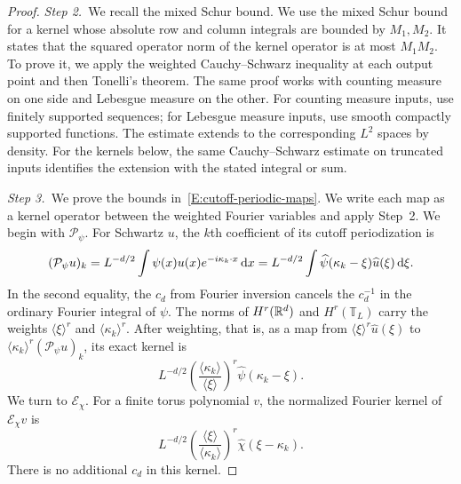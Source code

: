 \begin{proof}
  \medskip
  \noindent\textit{Step 2.~}We recall the mixed Schur bound. We use the mixed
  Schur bound for a
  kernel whose absolute row and column integrals are bounded by $M_1,M_2$. It
  states that the squared operator norm of the kernel operator is at most
  $M_1M_2$. To prove it, we apply the weighted Cauchy--Schwarz inequality at
  each output point and then Tonelli's theorem. The same proof works with
  counting measure on one side and Lebesgue measure on the other. For counting
  measure inputs, use finitely supported sequences; for Lebesgue measure
  inputs, use smooth compactly supported functions. The estimate extends to
  the corresponding $L^2$ spaces by density. For the kernels below, the same
  Cauchy--Schwarz estimate on truncated inputs identifies the extension with
  the stated integral or sum.

  \medskip
  \noindent\textit{Step 3.~}We prove the bounds
  in~\eqref{E:cutoff-periodic-maps}. We write each map as a kernel operator
  between the weighted Fourier variables and apply Step~2. We begin with
  $\mathcal{P}_\psi$. For Schwartz $u$, the $k$th coefficient of its cutoff
  periodization is
  \[
    (\mathcal{P}_\psi u)_k
    = L^{-d/2}\int\psi(x)u(x)e^{-i\kappa_k\cdot x}\,\mathrm{d} x
    = L^{-d/2}\int\widehat{\psi}(\kappa_k-\xi)\widehat{u}(\xi)\,\mathrm{d}\xi.
  \]
  In the second equality, the $c_d$ from Fourier inversion cancels the
  $c_d^{-1}$ in the ordinary Fourier integral of $\psi$. The norms of
  $H^r(\mathbb{R}^d)$ and $H^r(\mathbb{T}_L)$ carry the weights $\langle\xi\rangle^r$
  and $\langle\kappa_k\rangle^r$. After weighting, that is, as a map from
  $\langle\xi\rangle^r\widehat{u}(\xi)$ to
  $\langle\kappa_k\rangle^r(\mathcal{P}_\psi u)_k$, its exact kernel is
  \[
    L^{-d/2}\left(\frac{\langle\kappa_k\rangle}{\langle\xi\rangle}\right)^r
    \widehat{\psi}(\kappa_k-\xi).
  \]
  We turn to $\mathcal{E}_\chi$. For a finite torus polynomial $v$, the
  normalized Fourier kernel of $\mathcal{E}_\chi v$ is
  \[
    L^{-d/2}\left(\frac{\langle\xi\rangle}{\langle\kappa_k\rangle}\right)^r
    \widehat{\chi}(\xi-\kappa_k).
  \]
  There is no additional $c_d$ in this kernel.


\end{proof}
